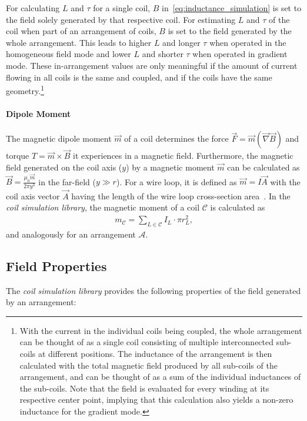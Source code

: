 For calculating $L$ and $\tau$ for a single coil, $B$ in~\eqref{eq:inductance_simulation} is set to the field solely generated by that respective coil. For estimating $L$ and $\tau$ of the coil when part of an arrangement of coils, $B$ is set to the field generated by the whole arrangement. This leads to higher $L$ and longer $\tau$ when operated in the homogeneous field mode and lower $L$ and shorter $\tau$ when operated in gradient mode. These in-arrangement values are only meaningful if the amount of current flowing in all coils is the same and coupled, and if the coils have the same geometry.\footnote{With the current in the individual coils being coupled, the whole arrangement can be thought of as a single coil consisting of multiple interconnected sub-coils at different positions. The inductance of the arrangement is then calculated with the total magnetic field produced by all sub-coils of the arrangement, and can be thought of as a sum of the individual inductances of the sub-coils. Note that the field is evaluated for every winding at its respective center point, implying that this calculation also yields a non-zero inductance for the gradient mode.}

\paragraph{Dipole Moment}
The magnetic dipole moment $\vec m$ of a coil determines the force $\vec F = \vec m (\vec \nabla \vec B)$ and torque $T = \vec m \times \vec B$ it experiences in a magnetic field. Furthermore, the magnetic field generated on the coil axis ($y$) by a magnetic moment $\vec m$ can be calculated as $\vec B = \frac{\mu_0 \vec m}{2\pi y^3}$ in the far-field ($y \gg r$). For a wire loop, it is defined as $\vec m = I \vec A$ with the coil axis vector $\vec A$ having the length of the wire loop cross-section area~\cite{demtroder_statische_2013}. In the \textit{coil simulation library}, the magnetic moment of a coil $\mathcal{C}$ is calculated as
\begin{align}\label{eq:dipole_moment_simulation}
    m_\mathcal{C} = \sum\limits_{L \in \mathcal{C}} I_L \cdot \pi r_L^2,
\end{align}
and analogously for an arrangement $\mathcal{A}$.

\subsection*{Field Properties}
The \textit{coil simulation library} provides the following properties of the field generated by an arrangement:

